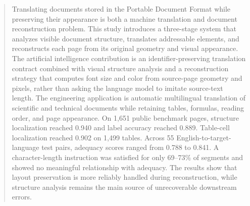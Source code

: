 \begin{abstract}
Translating documents stored in the Portable Document Format while preserving
their appearance is both a machine translation and document reconstruction
problem. This study introduces a three-stage system that analyzes visible
document structure, translates addressable elements, and reconstructs each page
from its original geometry and visual appearance. The artificial intelligence
contribution is an identifier-preserving translation contract combined with
visual structure analysis and a reconstruction strategy that computes font size
and color from source-page geometry and pixels, rather than asking the language
model to imitate source-text length. The engineering application is automatic
multilingual translation of scientific and technical documents while retaining
tables, formulas, reading order, and page appearance. On 1,651 public benchmark
pages, structure localization reached 0.940 and label accuracy reached 0.889.
Table-cell localization reached 0.902 on 1,499 tables. Across 55
English-to-target-language test pairs, adequacy scores ranged from 0.788 to
0.841. A character-length instruction was satisfied for only 69--73\% of
segments and showed no meaningful relationship with adequacy. The results show
that layout preservation is more reliably handled during reconstruction, while
structure analysis remains the main source of unrecoverable downstream errors.
\end{abstract}

